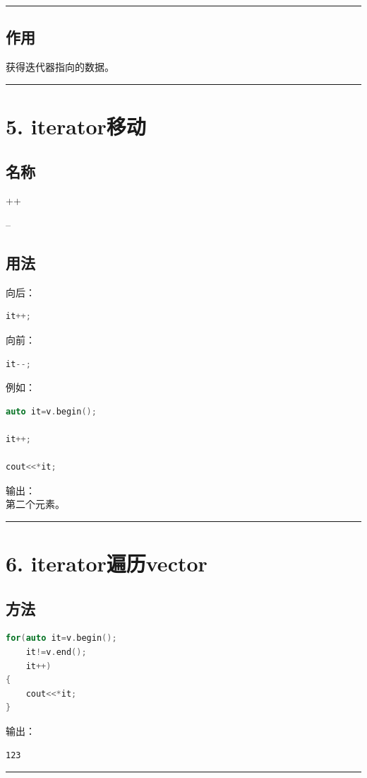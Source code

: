 \documentclass[9pt,twocolumn]{extarticle}
\begin{document}
\noindent\rule{\linewidth}{0.4pt}

\subsection{作用}
获得迭代器指向的数据。

\noindent\rule{\linewidth}{0.4pt}

\section{5. iterator移动}

\subsection{名称}
++

--

\subsection{用法}
向后：
\begin{lstlisting}[language=C++]
it++;
\end{lstlisting}
向前：
\begin{lstlisting}[language=C++]
it--;
\end{lstlisting}
例如：
\begin{lstlisting}[language=C++]
auto it=v.begin();

it++;

cout<<*it;
\end{lstlisting}
输出：\\
第二个元素。

\noindent\rule{\linewidth}{0.4pt}

\section{6. iterator遍历vector}

\subsection{方法}
\begin{lstlisting}[language=C++]
for(auto it=v.begin();
    it!=v.end();
    it++)
{
    cout<<*it;
}
\end{lstlisting}
输出：
\begin{lstlisting}
123
\end{lstlisting}

\noindent\rule{\linewidth}{0.4pt}
\end{document}

